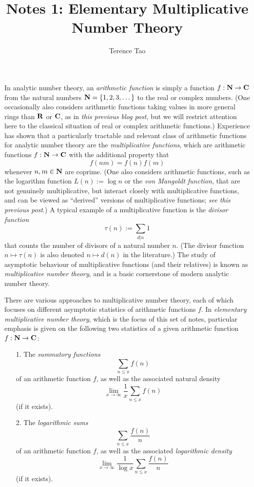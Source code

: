 \documentclass[10pt,reqno]{amsart}
\title{Notes 1: Elementary Multiplicative Number Theory}
\author{Terence Tao}
\begin{document}
\maketitle

In analytic number theory, an \emph{arithmetic function} is simply a function $f: {\bf N} \rightarrow {\bf C}$ from the natural numbers ${\bf N} = \{1,2,3,\dots\}$ to the real or complex numbers. (One occasionally also considers arithmetic functions taking values in more general rings than ${\bf R}$ or ${\bf C}$, as in \emph{this previous blog post}, but we will restrict attention here to the classical situation of real or complex arithmetic functions.) Experience has shown that a particularly tractable and relevant class of arithmetic functions for analytic number theory are the \emph{multiplicative functions}, which are arithmetic functions $f: {\bf N} \rightarrow {\bf C}$ with the additional property that
%
\begin{equation}
    f(nm) = f(n) f(m)
\end{equation}
%
whenever $n,m \in{\bf N}$ are coprime. (One also considers arithmetic functions, such as the logarithm function $L(n) := \log n$ or the \emph{von Mangoldt function}, that are not genuinely multiplicative, but interact closely with multiplicative functions, and can be viewed as “derived” versions of multiplicative functions; \emph{see this previous post}.) A typical example of a multiplicative function is the \emph{divisor function}
%
\begin{equation} \tau(n) := \sum_{d|n} 1 \end{equation}
%
that counts the number of divisors of a natural number $n$. (The divisor function $n \mapsto \tau(n)$ is also denoted $n \mapsto d(n)$ in the literature.) The study of asymptotic behaviour of multiplicative functions (and their relatives) is known as \emph{multiplicative number theory}, and is a basic cornerstone of modern analytic number theory.

There are various approaches to multiplicative number theory, each of which focuses on different asymptotic statistics of arithmetic functions $f$. In \emph{elementary multiplicative number theory}, which is the focus of this set of notes, particular emphasis is given on the following two statistics of a given arithmetic function $f: {\bf N} \rightarrow {\bf C}$:
%
\begin{itemize}
    \item[1.] The \emph{summatory functions}
    \[ \sum_{n \leq x} f(n) \]
    of an arithmetic function $f$, as well as the associated natural density
    \[ \lim_{x \rightarrow \infty} \frac{1}{x} \sum_{n \leq x} f(n) \]
    (if it exists).

    \item[2.] The \emph{logarithmic sums}
    \[ \sum_{n\leq x} \frac{f(n)}{n} \]
    of an arithmetic function $f$, as well as the associated \emph{logarithmic density}
    \[ \lim_{x \rightarrow \infty} \frac{1}{\log x} \sum_{n \leq x} \frac{f(n)}{n} \]
    (if it exists).
\end{itemize}
\end{document}
